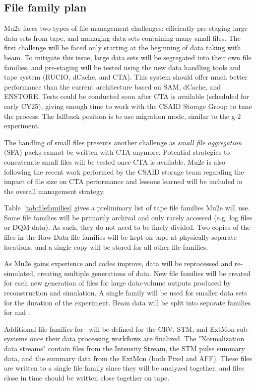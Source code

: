 \subsection{File family plan}
Mu2e faces two types of file management challenges: efficiently pre-staging large data sets from tape, and managing data sets containing many small files. The first challenge will be faced only starting at the beginning of data taking with beam. To mitigate this issue, large data sets will be segregated into their own file families, and pre-staging will be tested using the new data handling tools and tape system (RUCIO, dCache, and CTA). This system should offer much better performance than the current architecture based on SAM, dCache, and ENSTORE. Tests could be conducted soon after CTA is available (scheduled for early CY25), giving enough time to work with the CSAID Storage Group to tune the process. The fallback position is to use migration mode, similar to the g-2 experiment.

The handling of small files presents another challenge as \emph{small file aggregation} (SFA) packs cannot be written with CTA anymore. Potential strategies to concatenate small files will be tested once CTA is available. Mu2e is also following the recent work performed by the CSAID storage team regarding the impact of file size on CTA performance and lessons learned will be included in the overall management strategy.

Table~\ref{tab:filefamilies} gives a preliminary list of tape file families Mu2e will use. Some file families will be primarily archival and only rarely accessed (e.g. log files or DQM data). As such, they do not need to be finely divided. Two copies of the files in the Raw Data file families will be kept on tape at physically separate locations, and a single copy will be stored for all other file families.

As Mu2e gains experience and codes improve, data will be reprocessed and re-simulated, creating multiple generations of data. New file families will be created for each new generation of files for large data-volume outputs produced by reconstruction and simulation. A single family will be used for smaller data sets for the duration of the experiment.
Beam data will be split into separate families for \runone and \runtwo.

Additional file families for \passone\ will be defined for the CRV, STM, and ExtMon sub-systems once their data processing workflows are finalized. The "Normalization data streams" contain files from the Intensity Stream, the STM pulse summary data, and the summary data from the ExtMon (both Pixel and AFF). These files are written to a single file family since they will be analyzed together, and files close in time should be written close together on tape.

